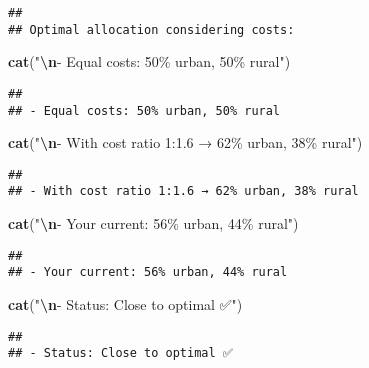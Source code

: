 \documentclass[
]{article}
\newenvironment{Shaded}{\begin{snugshade}}{\end{snugshade}}
\newcommand{\FunctionTok}[1]{\textcolor[rgb]{0.13,0.29,0.53}{\textbf{#1}}}
\newcommand{\NormalTok}[1]{#1}
\newcommand{\SpecialCharTok}[1]{\textcolor[rgb]{0.81,0.36,0.00}{\textbf{#1}}}
\newcommand{\StringTok}[1]{\textcolor[rgb]{0.31,0.60,0.02}{#1}}
\begin{document}
\begin{verbatim}
## 
## Optimal allocation considering costs:
\end{verbatim}

\begin{Shaded}
\begin{Highlighting}[]
\FunctionTok{cat}\NormalTok{(}\StringTok{"}\SpecialCharTok{\textbackslash{}n}\StringTok{{-} Equal costs: 50\% urban, 50\% rural"}\NormalTok{)}
\end{Highlighting}
\end{Shaded}

\begin{verbatim}
## 
## - Equal costs: 50% urban, 50% rural
\end{verbatim}

\begin{Shaded}
\begin{Highlighting}[]
\FunctionTok{cat}\NormalTok{(}\StringTok{"}\SpecialCharTok{\textbackslash{}n}\StringTok{{-} With cost ratio 1:1.6 → 62\% urban, 38\% rural"}\NormalTok{)}
\end{Highlighting}
\end{Shaded}

\begin{verbatim}
## 
## - With cost ratio 1:1.6 → 62% urban, 38% rural
\end{verbatim}

\begin{Shaded}
\begin{Highlighting}[]
\FunctionTok{cat}\NormalTok{(}\StringTok{"}\SpecialCharTok{\textbackslash{}n}\StringTok{{-} Your current: 56\% urban, 44\% rural"}\NormalTok{)}
\end{Highlighting}
\end{Shaded}

\begin{verbatim}
## 
## - Your current: 56% urban, 44% rural
\end{verbatim}

\begin{Shaded}
\begin{Highlighting}[]
\FunctionTok{cat}\NormalTok{(}\StringTok{"}\SpecialCharTok{\textbackslash{}n}\StringTok{{-} Status: Close to optimal ✅"}\NormalTok{)}
\end{Highlighting}
\end{Shaded}

\begin{verbatim}
## 
## - Status: Close to optimal ✅
\end{verbatim}
\end{document}
